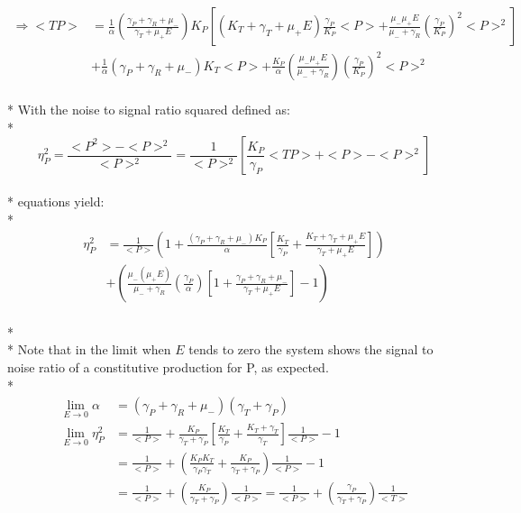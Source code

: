 \documentclass{article}
\begin{document}
\begin{align*}
    \Longrightarrow <TP> &= \frac{1}{\alpha}\left(\frac{\gamma_P + \gamma_R + \mu_-}{\gamma_T + \mu_+E}\right)K_P\left[(K_T + \gamma_T + \mu_+E)\frac{\gamma_P}{K_P}<P> + \frac{\mu_-\mu_+E}{\mu_- + \gamma_R}\left(\frac{\gamma_P}{K_P}\right)^2<P>^2\right]\\
                         &+\frac{1}{\alpha}(\gamma_P + \gamma_R + \mu_-)K_T<P> + \frac{K_P}{\alpha}\left(\frac{\mu_-\mu_+E}{\mu_- + \gamma_R}\right)\left(\frac{\gamma_P}{K_P}\right)^2<P>^2
\end{align*}
\\*
With the noise to signal ratio squared defined as:
\\*
\begin{equation*}
    \eta_P^2 = \frac{<P^2> - <P>^2}{<P>^2} = \frac{1}{<P>^2}\left[ \frac{K_P}{\gamma_P}<TP> + <P> - <P>^2\right]
\end{equation*}
\\*
equations yield:
\\*
\begin{align}
    \eta_P^2 &= \frac{1}{<P>}\left( 1 + \frac{(\gamma_P + \gamma_R + \mu_-)K_P}{\alpha}\left[\frac{K_T}{\gamma_P} + \frac{K_T + \gamma_T + \mu_+E}{\gamma_T + \mu_+E}\right] \right) \nonumber\\
             &+ \left( \frac{\mu_-(\mu_+E)}{\mu_- + \gamma_R}\left(\frac{\gamma_P}{\alpha}\right)\left[ 1 + \frac{\gamma_P + \gamma_R + \mu_-}{\gamma_T + \mu_+E}\right] - 1 \right)
\end{align}
\\*
\\*
Note that in the limit when $E$ tends to zero the system shows the signal to noise ratio of a constitutive production for P, as expected.  
\\*
\begin{align*}
    \lim_{E \to 0}\alpha   &= (\gamma_P + \gamma_R + \mu_-)(\gamma_T + \gamma_P)\\
    \lim_{E \to 0}\eta_P^2 &= \frac{1}{<P>} + \frac{K_P}{\gamma_T + \gamma_P}\left[\frac{K_T}{\gamma_P} + \frac{K_T + \gamma_T}{\gamma_T}\right]\frac{1}{<P>} - 1\\
                           &= \frac{1}{<P>} + \left(\frac{K_PK_T}{\gamma_P\gamma_T} + \frac{K_P}{\gamma_T + \gamma_P}\right)\frac{1}{<P>} - 1\\
                           &= \frac{1}{<P>} + \left(\frac{K_P}{\gamma_T + \gamma_P}\right)\frac{1}{<P>} = \frac{1}{<P>} + \left(\frac{\gamma_P}{\gamma_T + \gamma_P}\right)\frac{1}{<T>}
\end{align*}
\end{document}
